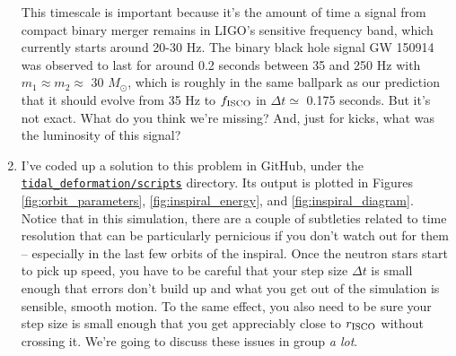 \documentclass[11pt]{article}
\begin{document}
\begin{enumerate}
\hspace{15pt} This timescale is important because it's the amount of time a signal from compact binary merger remains in LIGO's sensitive frequency band, which currently starts around 20-30 Hz. The binary black hole signal GW 150914 was observed to last for around 0.2 seconds between 35 and 250 Hz with $m_1 \approx m_2 \approx$ 30 $M_{\odot}$, which is roughly in the same ballpark as our prediction that it should evolve from 35 Hz to $f_{\rm ISCO}$ in $\Delta t \simeq$ 0.175 seconds. But it's not exact. What do you think we're missing? And, just for kicks, what was the luminosity of this signal?

\item I've coded up a solution to this problem in GitHub, under the \href{https://github.com/alurban/mentoring/blob/master/tidal_distortion/scripts/decaying_orbit.py}{\texttt{tidal\_deformation/scripts}} directory. Its output is plotted in Figures \ref{fig:orbit_parameters}, \ref{fig:inspiral_energy}, and \ref{fig:inspiral_diagram}. Notice that in this simulation, there are a couple of subtleties related to time resolution that can be particularly pernicious if you don't watch out for them -- especially in the last few orbits of the inspiral. Once the neutron stars start to pick up speed, you have to be careful that your step size $\Delta t$ is small enough that errors don't build up and what you get out of the simulation is sensible, smooth motion. To the same effect, you also need to be sure your step size is small enough that you get appreciably close to $r_{\rm ISCO}$ without crossing it. We're going to discuss these issues in group \emph{a lot}.


\end{enumerate}
\end{document}
